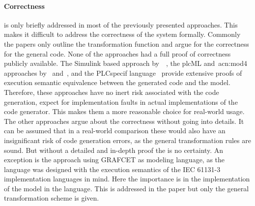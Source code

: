 \paragraph{Correctness} is only briefly addressed in most of the previously presented approaches.
This makes it difficult to address the correctness of the system formally.
Commonly the papers only outline the transformation function and argue for the correctness for the general code.
None of the approaches had a full proof of correctness publicly available.
The Simulink based approach by~\citeauthor{6489667}~\cite{6489667}, the plcML and~\acrshort{acn:mod4} approaches by~\citeauthor{WITSCH2015} and~\citeauthor{Obermeier:2015aa}, and the PLCspecif language~\cite{7819191, darvas2015syntax, darvas2015requirements, darvas2015formal, 10.1007/978-3-319-33693-0_32} provide extensive proofs of execution semantic equivalence between the generated code and the model.
Therefore, these approaches have no inert risk associated with the code generation, expect for implementation faults in actual implementations of the code generator.
This makes them a more reasonable choice for real-world usage.
The other approaches argue about the correctness without going into details.
It can be assumed that in a real-world comparison these would also have an insignificant risk of code generation errors, as the general transformation rules are sound.
But without a detailed and in-depth proof the is no certainty.
An exception is the approach using GRAFCET as modeling language, as the language was designed with the execution semantics of the IEC 61131-3 implementation languages in mind.
Here the importance is in the implementation of the model in the language.
This is addressed in the paper but only the general transformation scheme is given.

